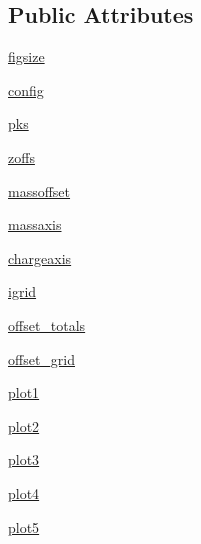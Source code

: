 \subsection*{Public Attributes}
\begin{DoxyCompactItemize}
\item 
\hyperlink{class_uni_dec_1_1unidec__modules_1_1nativez_1_1_native_z_ae76f39876ccc3aab4c29321e09714c40}{figsize}
\item 
\hyperlink{class_uni_dec_1_1unidec__modules_1_1nativez_1_1_native_z_af6a24d52d1c68060c9d7dfceeb7d05c0}{config}
\item 
\hyperlink{class_uni_dec_1_1unidec__modules_1_1nativez_1_1_native_z_a982aab89fde164965e26de746c80def1}{pks}
\item 
\hyperlink{class_uni_dec_1_1unidec__modules_1_1nativez_1_1_native_z_ac501c35f150a4c9fef0031e2108cf936}{zoffs}
\item 
\hyperlink{class_uni_dec_1_1unidec__modules_1_1nativez_1_1_native_z_a4679f2f039f447fbe1a856194a0bfc24}{massoffset}
\item 
\hyperlink{class_uni_dec_1_1unidec__modules_1_1nativez_1_1_native_z_aa1141b75aeb810afdb7e53603a4f6c82}{massaxis}
\item 
\hyperlink{class_uni_dec_1_1unidec__modules_1_1nativez_1_1_native_z_a1e4ae73b3205b32a6ec8abb9b837dff8}{chargeaxis}
\item 
\hyperlink{class_uni_dec_1_1unidec__modules_1_1nativez_1_1_native_z_a2af2834d84106f500243c40bed8b030c}{igrid}
\item 
\hyperlink{class_uni_dec_1_1unidec__modules_1_1nativez_1_1_native_z_a4a250e14521cbb52fe2e507a0453d0c4}{offset\+\_\+totals}
\item 
\hyperlink{class_uni_dec_1_1unidec__modules_1_1nativez_1_1_native_z_ac7299c9b4d060ec99e3aa97d6462b559}{offset\+\_\+grid}
\item 
\hyperlink{class_uni_dec_1_1unidec__modules_1_1nativez_1_1_native_z_a94f46d6e05632e5689237f3c0a38e46b}{plot1}
\item 
\hyperlink{class_uni_dec_1_1unidec__modules_1_1nativez_1_1_native_z_a5962daf769498244f737e7c87f74cf6b}{plot2}
\item 
\hyperlink{class_uni_dec_1_1unidec__modules_1_1nativez_1_1_native_z_a7901de0a8898552ff86728792ab20535}{plot3}
\item 
\hyperlink{class_uni_dec_1_1unidec__modules_1_1nativez_1_1_native_z_a82e28700ca64bdde63452d773d2c5074}{plot4}
\item 
\hyperlink{class_uni_dec_1_1unidec__modules_1_1nativez_1_1_native_z_a0555415e7f1ea7863ba887a11080e45d}{plot5}

\end{DoxyCompactItemize}
